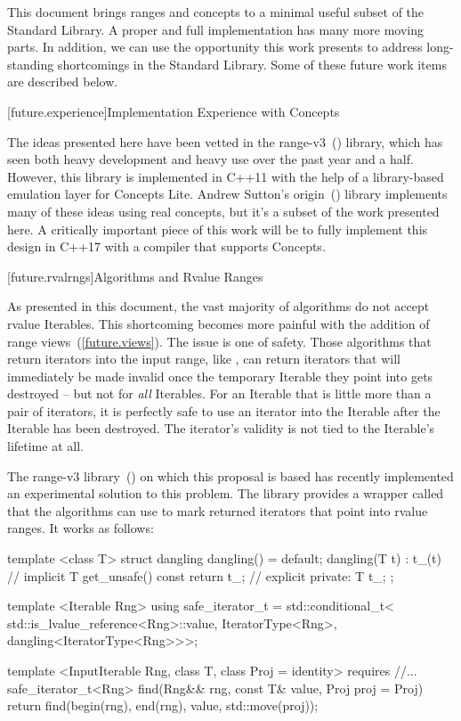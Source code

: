 
\pnum
This document brings ranges and concepts to a minimal useful subset of the Standard Library.
A proper and full implementation has many more moving parts. In addition, we can use the opportunity
this work presents to address long-standing shortcomings in the Standard Library. Some of these
future work items are described below.

[future.experience]{Implementation Experience with Concepts}

\pnum
The ideas presented here have been vetted in the range-v3~(\cite{range-v3}) library, which has seen both heavy
development and heavy use over the past year and a half. However, this library is implemented in
C++11 with the help of a library-based emulation layer for Concepts Lite. Andrew Sutton's origin~(\cite{origin})
library implements many of these ideas using real concepts, but it's a subset of the work presented
here. A critically important piece of this work will be to fully implement this design in C++17 with
a compiler that supports Concepts.

[future.rvalrngs]{Algorithms and Rvalue Ranges}

\pnum
As presented in this document, the vast majority of algorithms do not accept rvalue Iterables.
This shortcoming becomes more painful with the addition of range views~(\ref{future.views}).
The issue is one of safety. Those algorithms that return iterators into the input range, like
, can return iterators that will immediately be made invalid once the temporary
Iterable they point into gets destroyed -- but not for \textit{all} Iterables. For an Iterable that
is little more than a pair of iterators, it is perfectly safe to use an iterator into the Iterable
after the Iterable has been destroyed. The iterator's validity is not tied to the Iterable's
lifetime at all.

\pnum
The range-v3 library~(\cite{range-v3}) on which this proposal is based has recently implemented an
experimental solution to this problem. The library provides a wrapper called 
that the algorithms can use to mark returned iterators that point into rvalue ranges. It works
as follows:

\begin{codeblock}
  template <class T>
  struct dangling {
    dangling() = default;
    dangling(T t) : t_(t) {}            // implicit
    T get_unsafe() const { return t_; } // explicit
  private:
    T t_;
  };

  template <Iterable Rng>
  using safe_iterator_t =
    std::conditional_t<
      std::is_lvalue_reference<Rng>::value,
      IteratorType<Rng>,
      dangling<IteratorType<Rng>>>;

  template <InputIterable Rng, class T, class Proj = identity>
    requires //...
    safe_iterator_t<Rng>
      find(Rng&& rng, const T& value, Proj proj = Proj{}) {
        return find(begin(rng), end(rng), value, std::move(proj));
      }
\end{codeblock}

